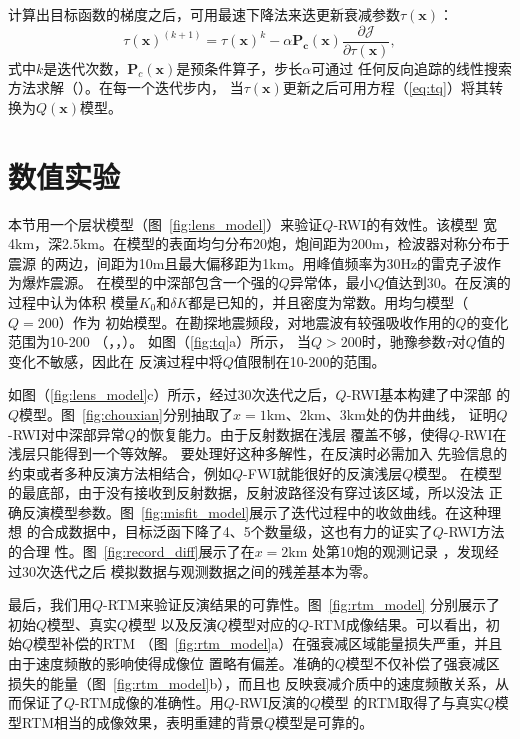 计算出目标函数的梯度之后，可用最速下降法来迭更新衰减参数$\tau(\mathbf{x})$：
\begin{equation}
    \tau(\mathbf{x})^{(k+1)}=\tau(\mathbf{x})^k-\alpha \mathbf{P_c}(\mathbf{x})
    \frac{\partial \mathcal{J}}{\partial \tau(\mathbf{x})},
\end{equation}
式中$k$是迭代次数，$\mathbf{P}_c(\mathbf{x})$是预条件算子，步长$\alpha$可通过
任何反向追踪的线性搜索方法求解（）。在每一个迭代步内，
当$\tau(\mathbf{x})$更新之后可用方程（\ref{eq:tq}）将其转换为$Q(\mathbf{x})$模型。


\newpage
\section{数值实验}
本节用一个层状模型（图~\ref{fig:lens_model}）来验证$Q$-RWI的有效性。该模型
宽4km，深2.5km。在模型的表面均匀分布20炮，炮间距为200m，检波器对称分布于震源
的两边，间距为10m且最大偏移距为1km。用峰值频率为30Hz的雷克子波作为爆炸震源。
在模型的中深部包含一个强的$Q$异常体，最小$Q$值达到30。在反演的过程中认为体积
模量$K_0$和$\delta K$都是已知的，并且密度为常数。用均匀模型（$Q=200$）作为
初始模型。在勘探地震频段，对地震波有较强吸收作用的$Q$的变化范围为10-200
（，，）。
如图（\ref{fig:tq}a）所示，
当$Q>200$时，驰豫参数$\tau$对$Q$值的变化不敏感，因此在
反演过程中将$Q$值限制在10-200的范围。

如图（\ref{fig:lens_model}c）所示，经过30次迭代之后，$Q$-RWI基本构建了中深部
的$Q$模型。图~\ref{fig:chouxian}分别抽取了$x=1$km、2km、3km处的伪井曲线，
证明$Q$-RWI对中深部异常$Q$的恢复能力。由于反射数据在浅层
覆盖不够，使得$Q$-RWI在浅层只能得到一个等效解。
要处理好这种多解性，在反演时必需加入
先验信息的约束或者多种反演方法相结合，例如$Q$-FWI就能很好的反演浅层$Q$模型。
在模型的最底部，由于没有接收到反射数据，反射波路径没有穿过该区域，所以没法
正确反演模型参数。图~\ref{fig:misfit_model}展示了迭代过程中的收敛曲线。在这种理想
的合成数据中，目标泛函下降了4、5个数量级，这也有力的证实了$Q$-RWI方法的合理
性。图~\ref{fig:record_diff}展示了在$x=2$km 处第10炮的观测记录
，发现经过30次迭代之后
模拟数据与观测数据之间的残差基本为零。

最后，我们用$Q$-RTM来验证反演结果的可靠性。图~\ref{fig:rtm_model}
分别展示了初始$Q$模型、真实$Q$模型
以及反演$Q$模型对应的$Q$-RTM成像结果。可以看出，初始$Q$模型补偿的RTM
（图~\ref{fig:rtm_model}a）在强衰减区域能量损失严重，并且由于速度频散的影响使得成像位
置略有偏差。准确的$Q$模型不仅补偿了强衰减区损失的能量（图~\ref{fig:rtm_model}b），而且也
反映衰减介质中的速度频散关系，从而保证了$Q$-RTM成像的准确性。用$Q$-RWI反演的$Q$模型
的RTM取得了与真实$Q$模型RTM相当的成像效果，表明重建的背景$Q$模型是可靠的。

